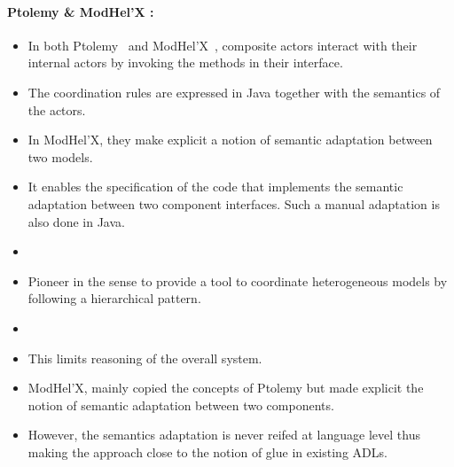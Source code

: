 
\paragraph{Ptolemy \& ModHel'X :}	
\begin{itemize}
	\item In both Ptolemy~\cite{ptoleframebib} and ModHel'X~\cite{modhelxbib}, composite actors interact with their internal actors by invoking the methods in their interface.
	
	\item The coordination rules are expressed in Java together with the semantics of the actors.
	
	\item In ModHel'X, they make explicit a notion of semantic adaptation between two models.
	
	\item It enables the specification of the code that implements the semantic adaptation between two component interfaces. Such a manual adaptation is also done in Java.
	
	\item {} 
	
	\item Pioneer in the sense to provide a tool to coordinate heterogeneous models by following a hierarchical pattern. 
	
	\item {}
	
	\item This limits reasoning of the overall system.
	
	\item ModHel'X, mainly copied the concepts of Ptolemy but made explicit the notion of semantic adaptation between two components.
	
	\item However, the semantics adaptation is never reifed at language level thus making the approach close to the notion of glue in existing ADLs.
	
\end{itemize}		



